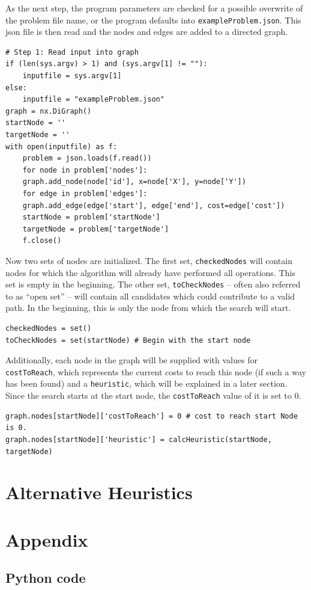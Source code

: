 \documentclass[12pt]{article}
\begin{document}
As the next step, the program parameters are checked for a possible overwrite of the problem file name, or the program defaults into \texttt{exampleProblem.json}.
This json file is then read and the nodes and edges are added to a directed graph.

\begin{lstlisting}
# Step 1: Read input into graph
if (len(sys.argv) > 1) and (sys.argv[1] != ""):
	inputfile = sys.argv[1]
else:
	inputfile = "exampleProblem.json"
graph = nx.DiGraph()
startNode = ''
targetNode = ''
with open(inputfile) as f:
	problem = json.loads(f.read())
	for node in problem['nodes']:
	graph.add_node(node['id'], x=node['X'], y=node['Y'])
	for edge in problem['edges']:
	graph.add_edge(edge['start'], edge['end'], cost=edge['cost'])
	startNode = problem['startNode']
	targetNode = problem['targetNode']
	f.close()
\end{lstlisting}

Now two sets of nodes are initialized.
The first set, \texttt{checkedNodes} will contain nodes for which the algorithm will already have performed all operations.
This set is empty in the beginning.
The other set, \texttt{toCheckNodes} -- often also referred to as \enquote{open set} -- will contain all candidates which could contribute to a valid path.
In the beginning, this is only the node from which the search will start.
\begin{lstlisting}
checkedNodes = set()
toCheckNodes = set(startNode) # Begin with the start node
\end{lstlisting}
Additionally, each node in the graph will be supplied with values for \texttt{costToReach}, which represents the current costs to reach this node (if such a way has been found) and a \texttt{heuristic}, which will be explained in a later section.
Since the search starts at the start node, the \texttt{costToReach} value of it is set to 0.
\begin{lstlisting}
graph.nodes[startNode]['costToReach'] = 0 # cost to reach start Node is 0.
graph.nodes[startNode]['heuristic'] = calcHeuristic(startNode, targetNode)
\end{lstlisting}

\section{Alternative Heuristics}


\printbibliography

\section{Appendix}
\subsection{Python code}
\label{sec:pythonCode}

\end{document}
